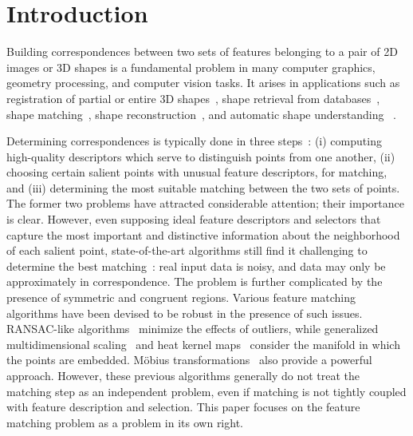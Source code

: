 \section{Introduction}
\label{sec:introduction}

Building correspondences between two sets of features belonging to a pair of 2D images or 3D shapes
is a fundamental problem in many computer graphics, geometry processing, and computer vision tasks.
It arises in applications such as
registration of partial or entire 3D shapes~\cite{Besl92,Gelfand05,Aiger08,li08,Chang09,Zeng10,vanKaick11,Chang11},
shape retrieval from databases~\cite{Bronstein11},
shape matching~\cite{Berg05,Brown07,Lorenzo08,Tevs09,Ovsjanikov10,Tevs11,SahilliogluY11,Windheuser11},
shape reconstruction~\cite{Brown07,Pekelny08,Wand09,Chang11},
and automatic shape understanding~\cite{Huttenlocher90,Lipman09,Sun10,Kim11} .

Determining correspondences is typically done in three steps~\cite{Johnson99,Lowe04,Sun09,Toler10,Leutenegger11}:
(i) computing high-quality descriptors which serve to distinguish points from one another,
(ii) choosing certain salient points with unusual feature descriptors, for matching,
and (iii) determining the most suitable matching between the two sets of points.
The former two problems have attracted considerable attention; their importance is clear.
However, even supposing ideal feature descriptors and selectors that capture the most important and distinctive information about the neighborhood of each salient point,
state-of-the-art algorithms  still find it challenging to determine the best matching~\cite{vanKaick11}:  real input data is noisy, and data may only be approximately in correspondence. 
The problem is further complicated by the presence of symmetric and congruent regions.
Various feature matching algorithms have been devised to be robust in the presence of such issues. RANSAC-like algorithms~\cite{Tevs09,Tevs11} minimize the effects of outliers,
while generalized multidimensional scaling~\cite{Bronstein11} and
heat kernel maps~\cite{Ovsjanikov10}  consider the manifold in which the points are embedded. M{\"o}bius transformations~\cite{Lipman09,Kim11} also provide a powerful approach.
However, these previous algorithms generally do not treat the matching step as an independent problem, even if matching is not tightly coupled with feature description and selection.
This paper focuses on the feature matching problem as a problem in its own right.

